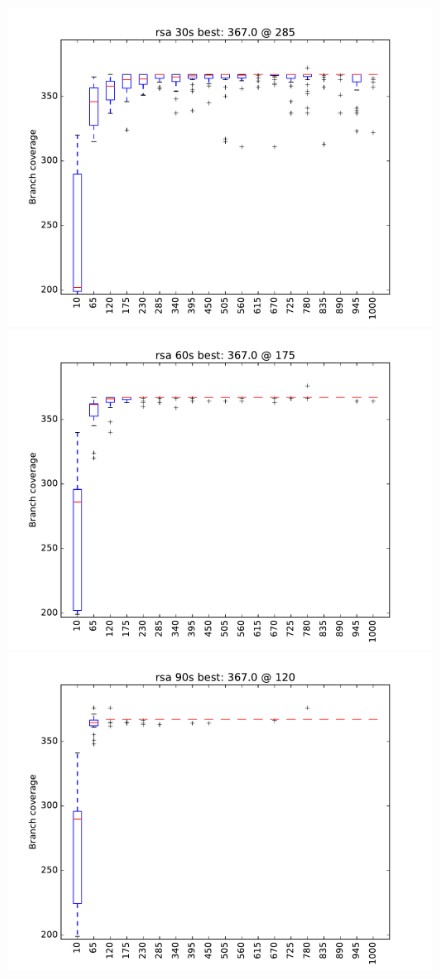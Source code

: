 \begin{figure}
\includegraphics[width=\columnwidth]{graphs/rsarand30}
\includegraphics[width=\columnwidth]{graphs/rsarand60}
\includegraphics[width=\columnwidth]{graphs/rsarand90}
\end{figure}

